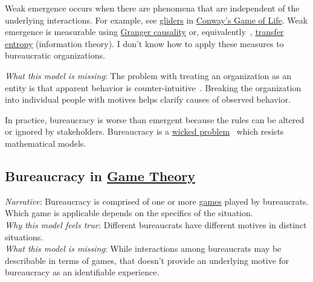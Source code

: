 Weak emergence occurs when there are phenomena that are independent of the underlying interactions. For example, see \href{https://en.wikipedia.org/wiki/Glider_(Conway\%27s_Life)}{gliders} 
in \href{https://en.wikipedia.org/wiki/Conway\%27s_Game_of_Life}{Conway's Game of Life}.
Weak emergence is measurable using \href{https://en.wikipedia.org/wiki/Granger_causality}{Granger causality} 
%
or, equivalently~\cite{2009_Barnett},
\href{https://en.wikipedia.org/wiki/Transfer_entropy}{transfer entropy} 
(information theory). I don't know how to apply these measures to bureaucratic organizations. 

\textit{What this model is missing}: The problem with treating an organization as an entity is that apparent behavior is counter-intuitive~\cite{2002_Gall}. Breaking the organization into individual people with motives helps clarify causes of observed behavior. 

In practice, bureaucracy is worse than emergent because the rules can be altered or ignored by  stakeholders. Bureaucracy is a \href{https://en.wikipedia.org/wiki/Wicked_problem}{wicked problem}~\cite{1973_Rittel} 
\iftoggle{WPinmargin}{\marginpar{$>$Wikipedia: wicked problem}}{}
which resists mathematical models. 

\subsection*{Bureaucracy in \href{https://en.wikipedia.org/wiki/Game_theory}{Game Theory}}
\textit{Narrative}: Bureaucracy is comprised of one or more \href{https://en.wikipedia.org/wiki/List_of_games_in_game_theory}{games} 
played by bureaucrats. Which game is applicable depends on the specifics of the situation. \\
\textit{Why this model feels true}: Different bureaucrats have different motives in distinct situations. \\
\textit{What this model is missing}: While interactions among bureaucrats may be describable in terms of games, that doesn't provide an underlying motive for bureaucracy as an identifiable experience.  

